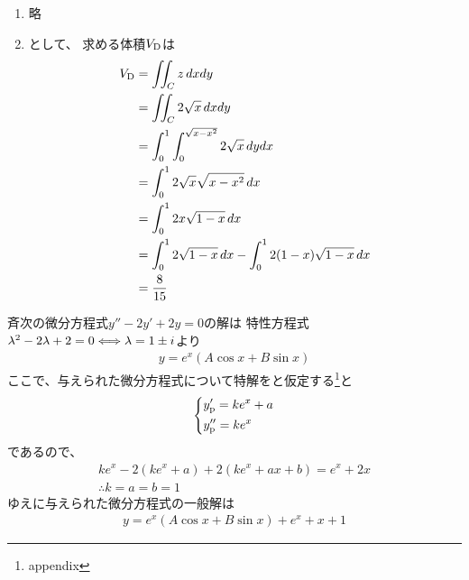 \begin{ans*}
  ${}$
  \begin{enumerate}[label=(\arabic*)]
    \item 略 %
    \item {}として、
    求める体積$V_{\rm{D}}$は
    \begin{align}
      V_{\rm{D}}
      &= \iint_C z\,dxdy \\
      &= \iint_C 2\sqrt{x}\,dxdy \\
      &= \int_{0}^{1}\int_{0}^{\sqrt{x-x^2}} 2\sqrt{x}\,dydx \\
      &= \int_{0}^{1}2\sqrt{x}\sqrt{x-x^2}\,dx \\
      &= \int_{0}^{1} 2x\sqrt{1-x}\,dx \\
      &= \int_{0}^{1} 2\sqrt{1-x}\,dx - \int_{0}^{1}2(1-x)\sqrt{1-x}\,dx \\
      &= \frac{8}{15}
    \end{align}
  \end{enumerate}

\end{ans*}

\begin{ans*}
  斉次の微分方程式$y'' - 2y' + 2y = 0$の解は
  特性方程式$\grl^2 - 2\grl + 2 = 0\Longleftrightarrow \grl = 1\pm i$より
  \begin{gather}
    y = e^x (A\cos x + B\sin x)
  \end{gather}
  ここで、与えられた微分方程式について特解をと仮定する\footnote{appendix}と
  \begin{gather}
    \begin{dcases*}
      y'_{\rm{p}} = ke^x + a \\
      y''_{\rm{p}} = ke^x
    \end{dcases*}
  \end{gather}
  であるので、
  \begin{gather}
    ke^x - 2(ke^x + a) + 2(ke^x + ax + b) = e^x + 2x \\
    \therefore k = a = b = 1
  \end{gather}
  ゆえに与えられた微分方程式の一般解は
  \begin{gather}
    y = e^x(A\cos x + B\sin x) + e^x + x + 1
  \end{gather}
\end{ans*}

